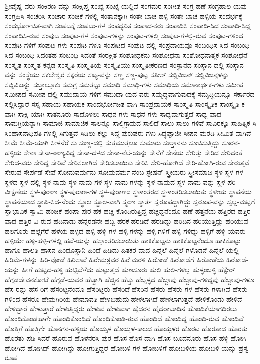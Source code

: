 {ಶ್ರೀವೈಷ್ಣ-ವರು
ಸಂಕಿರಣ-ವನ್ನು
ಸಂಕ್ಷಿಪ್ತ
ಸಂಖ್ಯೆ
ಸಂಖ್ಯೆ-ಯಲ್ಲಿವೆ
ಸಂಗಮರ
ಸಂಗೀತ
ಸಂಗ್ರ-ಹಣೆ
ಸಂಗ್ರಹಾಲ-ಯವು
ಸಂಗ್ರಹಿಸಿ
ಸಂಚರಿಸಿ
ಸಂಚಾರ
ಸಂಚಿಕೆ-ಗಳಲ್ಲಿ
ಸಂತಾನಕ್ಕಾಗಿ
ಸಂತೇ-ಬಾಚ-ಹಳ್ಳಿ
ಸಂತೇ-ಬಾಚ-ಹಳ್ಳಿಯ
ಸಂದರ್ಭಕ್ಕೆ
ಸಂದರ್ಭೋಚಿತ-ವಾಗಿ
ಸಂಪಟಕ್ಕೆ
ಸಂಪಟು-ಗಳ
ಸಂಪದ್ಭರಿತ
ಸಂಪಾದ-ಕರು
ಸಂಪಾದಿಸಿ
ಸಂಪಾದಿ-ಸಿದ
ಸಂಪಾದಿ-ಸಿದ್ದ
ಸಂಪಾದಿಸಿ-ರುವ
ಸಂಪುಟ
ಸಂಪುಟ-ಗಳ
ಸಂಪುಟ-ಗಳನ್ನು
ಸಂಪುಟ-ಗಳಲ್ಲಿ
ಸಂಪುಟ-ಗಳಲ್ಲಿ-ರುವ
ಸಂಪುಟ-ಗಳಿಂದ
ಸಂಪುಟ-ಗಳಿಗೆ
ಸಂಪುಟ-ಗಳು
ಸಂಪುಟ-ಗಳೂ
ಸಂಪುಟದ
ಸಂಪುಟ-ದಲ್ಲಿ
ಸಂಪ್ರದಾಯವೂ
ಸಂಬಂಧಿಸ-ಸಿದ
ಸಂಬಂಧಿ-ಸಿದ
ಸಂಬಂಧಿ-ಸಿದಂತಹ
ಸಂಬಂಧಿ-ಸಿದಂತೆ
ಸಂರಕ್ಷಿತ
ಸಂಶೋಧಕನು
ಸಂಶೋಧನಾ
ಸಂಶೋಧನಾತ್ಮಕ
ಸಂಶೋಧನೆ
ಸಂಸ್ಕೃತ
ಸಂಸ್ಕೃತ-ಕನ್ನಡ
ಸಂಸ್ಕೃತಿ
ಸಂಸ್ಕೃತಿಯ
ಸಂಸ್ಕೃತಿಯು
ಸಂಸ್ಕೃತೀಕರಣದ
ಸಂಸ್ಥಾನದ
ಸಂಸ್ಥಾನ-ದಲ್ಲಿ
ಸಂಸ್ಥಾನ-ವನ್ನು
ಸಂಸ್ಥೆಯು
ಸಕಲೇಶ್ವರ
ಸಕ್ಕರೆಯ
ಸಖ್ಯ-ವನ್ನು
ಸಣ್ಣ
ಸಣ್ಣ-ಪುಟ್ಟ
ಸತೀಶ್
ಸಬ್ಡಿವಿಜನ್
ಸಬ್ಡಿವಿಜನ್ಗಳನ್ನು
ಸಬ್ಡಿವಿಜನ್ನ್ನು
ಸಬ್ತಾಲ್ಲೂಕು
ಸಮಗ್ರ
ಸಮತಟ್ಟು
ಸಮಾಧಿ
ಸಮಾಧಿ-ಗಳು
ಸಮಾಧಿಯ
ಸಮಾನಾರ್ಥಕ-ಗಳು
ಸಮೀಪ
ಸಮೀಪದ
ಸಮೀಪ-ದಲ್ಲಿ
ಸಮುದಾಯ-ಗಳಿಗೆ
ಸಮುದಾ-ಯದ-ವರು
ಸಮೃದ್ಧವಾಗುವುದಕ್ಕೆ
ಸಮೃದ್ಧಿಯನ್ನೂ
ಸರ್ಕಾರದ
ಸಲ್ಲಿಸಿದ್ದಾರೆ
ಸಸ್ಯ
ಸಹಾಯ
ಸಹಾಯಕ
ಸಾಂದರ್ಭೋಚಿತ-ವಾಗಿ
ಸಾಂಪ್ರದಾಯಕ
ಸಾಂಸ್ಕೃತಿ
ಸಾಂಸ್ಕೃತಿಕ
ಸಾಂಸ್ಕೃತಿ-ಕ-ವಾಗಿ
ಸಾಕ್ಷಿ-ಯಾಗಿ
ಸಾತನೂರು
ಸಾದೊಳಲು
ಸಾಧನ-ಗಳು
ಸಾಧನೆ-ಗಳು
ಸಾಧ್ಯವಾಗುತ್ತದೆ
ಸಾಧ್ಯ-ವಾದ
ಸಾಮಗ್ರಿಯನ್ನಾಗಿ
ಸಾಮಾಜಿ
ಸಾಮಾಜಿಕ
ಸಾಲನ್ನೂ
ಸಾಲಿಗ್ರಾಮದ
ಸಾಲಿದೆ
ಸಾಲು
ಸಾಲು-ಗಳಿವೆ
ಸಾವಿರಕ್ಕೂ
ಸಾಹಿತ್ಯಿಕ
ಸಿ
ಸಿಂಹಾಸನಾಧಿಪತಿ-ಗಳಲ್ಲಿ
ಸಿಗುತ್ತವೆ
ಸಿಡಿಲು-ಕಲ್ಲು
ಸಿದ್ಧ-ಪುರುಷರು-ಗಳು
ಸಿದ್ಧಪ್ಪಾಜೀ
ಸೀಪನ-ಮರಡಿ
ಸೀಮಿತ-ವಾಗಿವೆ
ಸೀಮೆ
ಸೀಮೆ-ಯಾಗಿ
ಸೀಳನೆರೆ
ಸು
ಸುಣ್ಣ-ದಲ್ಲಿ
ಸುತ್ತಮುತ್ತಲೂ
ಸುಮಾರು
ಸುಲ್ತಾನನು
ಸೂಚಿಸುತ್ತಿದ್ದು
ಸೂರನ-ಹಳ್ಳಿಯ
ಸೇನಾ
ಸೇನಾ-ಠಾಣ್ಯವಿದ್ದ
ಸೇನಾ-ದಳದ
ಸೇನಾ-ನೆಲೆ-ಯನ್ನು
ಸೇನೆಗೆ
ಸೇನೆಯ
ಸೇರಿತ್ತು
ಸೇರಿದ
ಸೇರಿದಂತೆ
ಸೇರಿದ-ವರು
ಸೇರಿದ್ದ
ಸೇರಿವೆ
ಸೇರಿಸಲಾಗಿದೆ
ಸೇರಿಸಲಾಯಿತು
ಸೇರಿಸಿ
ಸೇರಿ-ಹೋಗಿದೆ
ಸೇರಿ-ಹೋಗಿ-ರುವ
ಸೇರುತ್ತವೆ
ಸೇರುವ
ಸೇರ್ಪಡೆ
ಸೇವೆ
ಸೋಮವರ್ಮನು
ಸೋಮವರ್ಮ-ನೆಂಬ
ಸ್ಟೇಷನ್
ಸ್ತ್ರೀಯರು
ಸ್ತ್ರೀಸಮಾಜ
ಸ್ಥಳ
ಸ್ಥಳ-ಗಳ
ಸ್ಥಳದ
ಸ್ಥಳ-ದಲ್ಲಿ
ಸ್ಥಳ-ನಾಮ
ಸ್ಥಳ-ನಾಮ-ಗಳ
ಸ್ಥಳ-ನಾಮ-ಗಳನ್ನು
ಸ್ಥಳ-ನಾಮದ
ಸ್ಥಳ-ನಾಮ-ವನ್ನು
ಸ್ಥಳ-ಪರಿ-ವೀಕ್ಷಣೆಯ
ಸ್ಥಳ-ಪುರಾಣ
ಸ್ಥಳ-ಪುರಾಣ-ಗಳ
ಸ್ಥಳ-ಪುರಾಣದ
ಸ್ಥಳಾಂತರದ
ಸ್ಥಳಾಂತರಿಸಲಾಯಿತು
ಸ್ಥಳೀಯ
ಸ್ಥಾಪನೆಯ
ಸ್ಥಾಪನೆಯಾದ
ಸ್ಥಾಪಿ-ಸಿದ-ನೆಂದು
ಸ್ಥೂಲ
ಸ್ಥೂಲ-ವಾಗಿ
ಸ್ಮರಣ
ಸ್ಮಾರ್ತ
ಸ್ವರೂಪದ್ದಾಗಿದ್ದು
ಸ್ವರೂಪ-ವನ್ನು
ಸ್ವಲ್ಪ-ಮಟ್ಟಿಗೆ
ಸ್ವಾಭಾವಿಕ
ಸ್ವಾಮಿ
ಹಂಚಿಕೆ
ಹಂಪಾ-ಪುರ
ಹಕ
ಹಚ್ಚಿ-ಕೊಂಡಿರುತ್ತಿದ್ದ
ಹಚ್ಚಿದ್ದನೆಂದೂ
ಹಣೆ
ಹತ್ತನೆಯ
ಹತ್ತಿರದ
ಹತ್ತಿರ-ವಾದ
ಹತ್ತಿರ-ವಿ-ರುವ
ಹದಿನಾಡು
ಹನ್ನೆರಡನೇ
ಹಬ್ಬ
ಹರಕೆ
ಹರಡಿದೆ
ಹರಡಿದ್ದು
ಹರಿದಿನ
ಹರಿಯುತ್ತಿದ್ದು
ಹರಿಯುವ
ಹಲಗೂರು
ಹಲ್ಲೆಗೆರೆ
ಹಳೆಯ
ಹಳ್ಳದ
ಹಳ್ಳಿ
ಹಳ್ಳಿ-ಗಳ
ಹಳ್ಳಿ-ಗಳನ್ನು
ಹಳ್ಳಿ-ಗಳಿಗೆ
ಹಳ್ಳಿ-ಗಳಿದ್ದು
ಹಳ್ಳಿಗೆ
ಹಳ್ಳಿ-ಯವರು
ಹಳ್ಳಿಯೇ
ಹಳ್ಳಿ-ಹಳ್ಳಿ-ಗಳಲ್ಲಿ
ಹವೆ-ಯನ್ನು
ಹಸ್ತಾಂತರಿಸಲಾಯಿತು
ಹಾಕಿಕೊಟ್ಟನು
ಹಾಕಿಕೊಟ್ಟನೆಂದೂ
ಹಾಕಿಕೊಟ್ಟು
ಹಾಗೂ
ಹಾಲತಿ
ಹಾಸನ
ಹಿಂದೂಸ್ಥಾನಿ
ಹಿಂದೆ
ಹಿಡಿದು
ಹಿತಕರ-ವಾದ
ಹಿನ್ನೆಲೆ
ಹಿನ್ನೆಲೆ-ಗಳೊಡನೆ
ಹಿನ್ನೆಲೆ-ಯಲ್ಲಿ
ಹಿರಿಮೆ-ಗಳನ್ನು
ಹಿರಿ-ವೋಡೆ
ಹಿರಿಸಾವೆ
ಹಿರೇಮಠ್ರವರ
ಹಿರೇಮರಳಿ
ಹಿರೋಡೆ
ಹಿರೋಡೆಗೆ
ಹಿರೋಡೆಯ
ಹಿರೋಡೆ-ಯನ್ನು
ಹೀಗೆ
ಹುಟ್ಟಿದ-ಹಳ್ಳಿ
ಹುಟ್ಟಿಬೆಳೆದು
ಹುಟ್ಟುತ್ತದೆ
ಹುಣಸೂರು
ಹುಲಿ
ಹುಲಿ-ಗಳಿಲ್ಲ
ಹುಳ್ಳಂಬಳ್ಳಿ
ಹೆಕ್ಟೇರ್
ಹೆಗ್ಗಡದೇವನಕೋಟೆ
ಹೆಗ್ಗಡೆ-ಯವರ
ಹೆಚ್ಚಾಗಿ
ಹೆಚ್ಚಿನ
ಹೆಚ್ಚು
ಹೆಬ್ಬಳ್ಳದ
ಹೆಬ್ಬಾವು
ಹೆಬ್ಬಾವು-ಗಳಿದ್ದವು
ಹೆಬ್ಬಾವು-ಗಳೂ
ಹೆಸ-ರನ್ನು
ಹೆಸ-ರಿಗೆ
ಹೆಸರಿಟ್ಟನೆಂದೂ
ಹೆಸರಿಟ್ಟರು
ಹೆಸರಿದೆ
ಹೆಸರಿನ
ಹೆಸರು
ಹೆಸರು-ಗಳ
ಹೆಸರು-ಗಳಾಗಿವೆ
ಹೆಸರು-ಗಳಿಂದ
ಹೆಸರೂ
ಹೇಮಗಿರಿಯ
ಹೇಮಾವತಿ
ಹೇಳಬಹುದು
ಹೇಳಲಾಗಿದೆ
ಹೇಳಲಾಗುತ್ತದೆ
ಹೇಳಿಕೊಂಡು
ಹೇಳಿದೆ
ಹೇಳಿದ್ದಾರೆ
ಹೇಳುತ್ತಾರೆ
ಹೇಳುತ್ತಿದ್ದರು
ಹೇಳುವ
ಹೇಳುವಾಗ
ಹೈದರನ
ಹೈದರಾಬಾದಿನ
ಹೊಂದಿಕೆಯಾಗದಿರಲು
ಹೊಂದಿಕೊಂಡಹಾಗೇ
ಹೊಂದಿಕೊಂಡಿದೆ
ಹೊಂದಿಕೊಂಡಿ-ರುವ
ಹೊಂದಿದೆ
ಹೊಂದಿದ್ದ
ಹೊಂದಿ-ರುವ
ಹೊಂದಿವೆ
ಹೊತ್ತಿಗೆ
ಹೊತ್ತಿಗೇ
ಹೊನಗನ-ಹಳ್ಳಿಯ
ಹೊಯ್ಸಳ
ಹೊಯ್ಸಳ-ಕಾಲದ
ಹೊಯ್ಸಳರ
ಹೊರಟ
ಹೊರತಾದ
ಹೊರತು
ಹೊರತು-ಪಡಿ-ಸಿದರೆ
ಹೊರುವ
ಹೊಳೆನರಸಿ-ಪುರ
ಹೊಸ
ಹೊಸ-ದಾಗಿ
ಹೊಸ-ಬೂದನೂರು
ಹೊಸ-ಹಳ್ಳಿ
ಹೋಗಿ
ಹೋಗಿದೆ
ಹೋಗಿದ್
ಹೋಗಿದ್ದು
ಹೋಗುತ್ತಿದ್ದರೆ
ಹೋಬಳಿ-ಗಳ
ಹೋಬಳಿಗೆ
ಹೋಬಳಿಯ
ಹೋಬಳಿ-ಯನ್ನು
ಹ್ರಸ್ವ-ರೂಪ
}

